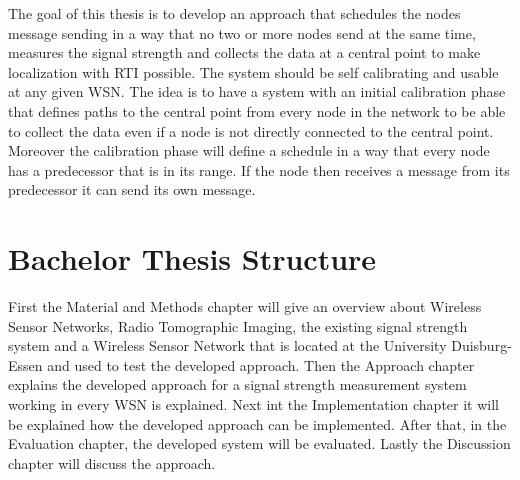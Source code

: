 The goal of this thesis is to develop an approach that schedules the nodes message sending in a way that no two or more nodes send at the same time, measures the signal strength and collects the data at a central point to make localization with RTI possible. The system should be self calibrating and usable at any given WSN. The idea is to have a system with an initial calibration phase that defines paths to the central point from every node in the network to be able to collect the data even if a node is not directly connected to the central point. Moreover the calibration phase will define a schedule in a way that every node has a predecessor that is in its range. If the node then receives a message from its predecessor it can send its own message.   


\section{Bachelor Thesis Structure}
First the Material and Methods chapter will give an overview about Wireless Sensor Networks, Radio Tomographic Imaging, the existing signal strength system and a Wireless Sensor Network that is located at the University Duisburg-Essen and used to test the developed approach. Then the Approach chapter explains the developed approach for a signal strength measurement system working in every WSN is explained. Next int the Implementation chapter it will be explained how the developed approach can be implemented. After that, in the Evaluation chapter, the developed system will be evaluated. Lastly the Discussion chapter will discuss the approach.